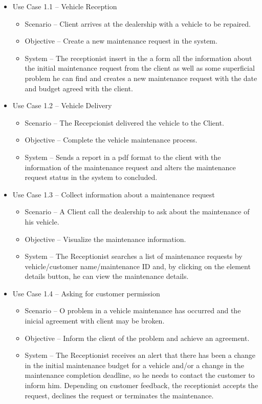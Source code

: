 \begin{itemize}
    \item Use Case 1.1 – Vehicle Reception
    \begin{itemize}
      \item Scenario – Client arrives at the dealership with a vehicle to be repaired.
      \item Objective – Create a new maintenance request in the system.
      \item System – The receptionist insert in the a form all the information about the initial maintenance request from the client as well as some superficial problem he can find and creates a new maintenance request with the date and budget agreed with the client. 
    \end{itemize}
    \item Use Case 1.2 – Vehicle Delivery 
    \begin{itemize}
      \item Scenario – The Recepcionist delivered the vehicle to the Client.
      \item Objective – Complete the vehicle maintenance process.
      \item System – Sends a report in a pdf format to the client with the information of the maintenance request and alters the maintenance request status in the system to concluded. 
    \end{itemize}
    \item Use Case 1.3 – Collect information about a maintenance request
    \begin{itemize}
      \item Scenario – A Client call the dealership to ask about the maintenance of his vehicle.
      \item Objective – Visualize the maintenance information.
      \item System –  The Receptionist searches a list of maintenance requests by vehicle/customer name/maintenance ID and, by clicking on the element details button, he can view the maintenance details.
    \end{itemize}
    \item Use Case 1.4 – Asking for customer permission
    \begin{itemize}
      \item Scenario – O problem in a vehicle maintenance has occurred and the inicial agreement with client may be broken.
      \item Objective – Inform the client of the problem and achieve an agreement.
      \item System – The Receptionist receives an alert that there has been a change in the initial maintenance budget for a vehicle and/or a change in the maintenance completion deadline, so he needs to contact the customer to inform him. Depending on customer feedback, the receptionist accepts the request, declines the request or terminates the maintenance.
    \end{itemize}
  \end{itemize}  
  \hfill \break


